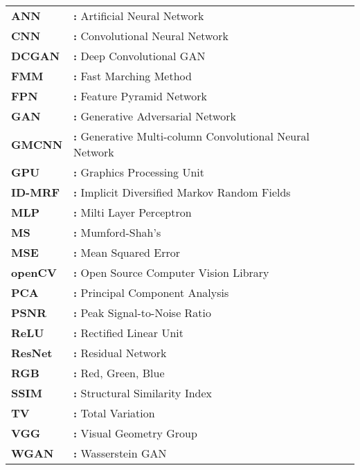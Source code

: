 \hspace{-3mm}

\begin{tabular}{ p{2cm} l }
    {\bf{ANN}} & {\bf:} Artificial Neural Network\\
    {\bf{CNN}} & {\bf:} Convolutional Neural Network\\
    {\bf{DCGAN}} & {\bf:} Deep Convolutional GAN\\
    {\bf{FMM}} & {\bf:} Fast Marching Method\\
    {\bf{FPN}} & {\bf:} Feature Pyramid Network\\
    {\bf{GAN}} & {\bf:} Generative Adversarial Network\\
    {\bf{GMCNN}} & {\bf:} Generative Multi-column Convolutional Neural Network\\
    {\bf{GPU}} & {\bf:} Graphics Processing Unit\\
    {\bf{ID-MRF}} & {\bf:} Implicit Diversified Markov Random Fields\\
    {\bf{MLP}} & {\bf:} Milti Layer Perceptron\\
    {\bf{MS}} & {\bf:} Mumford-Shah's\\
    {\bf{MSE}} & {\bf:} Mean Squared Error\\
    {\bf{openCV}} & {\bf:} Open Source Computer Vision Library\\
    {\bf{PCA}} & {\bf:} Principal Component Analysis\\
    {\bf{PSNR}} & {\bf:} Peak Signal-to-Noise Ratio\\
    {\bf{ReLU}} & {\bf:} Rectified Linear Unit\\
    {\bf{ResNet}} & {\bf:} Residual Network\\
    {\bf{RGB}} & {\bf:} Red, Green, Blue\\
    {\bf{SSIM}} & {\bf:} Structural Similarity Index\\
    {\bf{TV}} & {\bf:} Total Variation\\
    {\bf{VGG}} & {\bf:} Visual Geometry Group\\
    {\bf{WGAN}} & {\bf:} Wasserstein GAN\\
\end{tabular}

